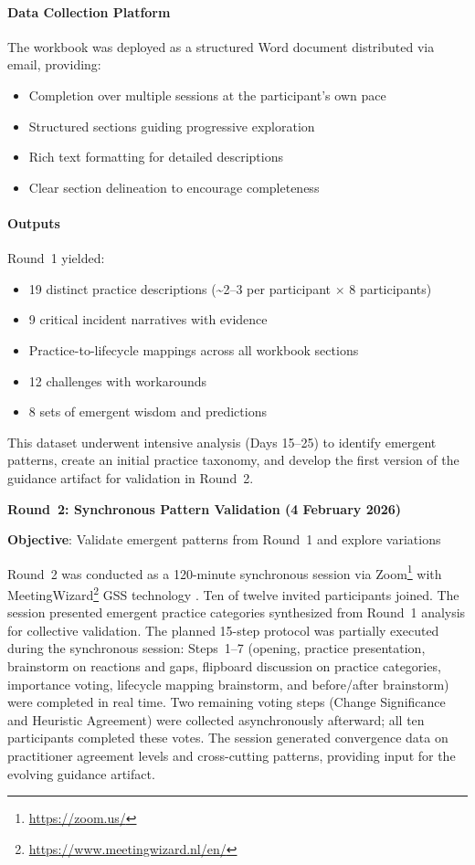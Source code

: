\paragraph{Data Collection Platform}

The workbook was deployed as a structured Word document distributed via email,
providing:
\begin{itemize}
    \item Completion over multiple sessions at the participant's own pace
    \item Structured sections guiding progressive exploration
    \item Rich text formatting for detailed descriptions
    \item Clear section delineation to encourage completeness
\end{itemize}

\paragraph{Outputs}

Round~1 yielded:
\begin{itemize}
    \item 19 distinct practice descriptions (\textasciitilde2--3 per participant $\times$ 8 participants)
    \item 9 critical incident narratives with evidence
    \item Practice-to-lifecycle mappings across all workbook sections
    \item 12 challenges with workarounds
    \item 8 sets of emergent wisdom and predictions
\end{itemize}

This dataset underwent intensive analysis (Days 15--25) to identify emergent
patterns, create an initial practice taxonomy, and develop the first version of
the guidance artifact for validation in Round~2.

\textbf{Round~2: Synchronous Pattern Validation (4 February 2026)}

\textbf{Objective}: Validate emergent patterns from Round~1 and explore variations

Round~2 was conducted as a 120-minute synchronous session via Zoom\footnote{\url{https://zoom.us/}} with
MeetingWizard\footnote{\url{https://www.meetingwizard.nl/en/}} GSS technology \parencite[see also][for a recent application in EA research]{nieuwenhuis_towards_2025}. Ten of twelve invited participants joined. The
session presented emergent practice categories synthesized from Round~1
analysis for collective validation. The planned 15-step protocol was partially
executed during the synchronous session: Steps~1--7 (opening, practice
presentation, brainstorm on reactions and gaps, flipboard discussion on
practice categories, importance voting, lifecycle mapping brainstorm, and
before/after brainstorm) were completed in real time. Two remaining voting
steps (Change Significance and Heuristic Agreement) were collected
asynchronously afterward; all ten participants completed these votes. The
session generated convergence data on practitioner agreement levels and
cross-cutting patterns, providing input for the evolving guidance artifact.

